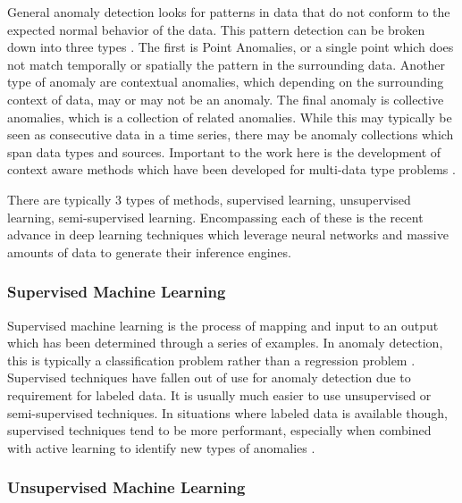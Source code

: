 General anomaly detection looks for patterns in data that do not conform to the expected normal behavior of the data.  This pattern detection can be broken down into three types \cite{chandolaAnomalyDetectionSurvey}. The first is Point Anomalies, or a single point which does not match temporally or spatially the pattern in the surrounding data.  Another type of anomaly are contextual anomalies, which depending on the surrounding context of data, may or may not be an anomaly.  The final anomaly is collective anomalies, which is a collection of related anomalies.  While this may typically be seen as consecutive data in a time series, there may be anomaly collections which span data types and sources. Important to the work here is the development of context aware methods which have been developed for multi-data type problems \cite{branisavljevicImprovedRealtimeData2011}.

There are typically 3 types of methods, supervised learning, unsupervised learning, semi-supervised learning.  Encompassing each of these is the recent advance in deep learning techniques which leverage neural networks and massive amounts of data to generate their inference engines.


\subsubsection{Supervised Machine Learning}


Supervised machine learning is the process of mapping and input to an output which has been determined through a series of examples.  In anomaly detection, this is typically a classification problem rather than a regression problem \cite{chandolaAnomalyDetectionSurvey}. Supervised techniques have fallen out of use for anomaly detection due to requirement for labeled data. It is usually much easier to use unsupervised or semi-supervised techniques.  In situations where labeled data is available though, supervised techniques tend to be more performant, especially when combined with active learning to identify new types of anomalies \cite{goernitzSupervisedAnomalyDetection2013}.

 
\subsubsection{Unsupervised Machine Learning}

